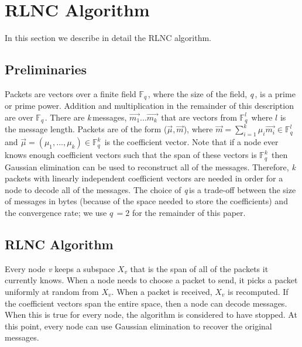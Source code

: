 \documentclass{article} %
\def\numMessages{\textit{k}\,}
\def\fieldSize{\textit{q}\,}
\begin{document}
\section{RLNC Algorithm}\label{subsec:RLNC}
In this section we describe in detail the RLNC algorithm.
\subsection{Preliminaries}
Packets are vectors over a finite field $\mathbb{F}_{\fieldSize}$, where the size of the field, \fieldSize, is a prime or prime power. Addition and multiplication in the remainder of this description are over $\mathbb{F}_{\fieldSize}$. There are \numMessages messages, $\vec{m_{1}}...\vec{m_{\numMessages}}$ that are vectors from $\mathbb{F}_{\fieldSize}^{l}$ where $l$ is the message length. Packets are of the form ($\vec{\mu}, \vec{m}$), where $\vec{m} = \sum_{i=1}^{\numMessages} \mu_i\vec{m_i} \in \mathbb{F}_{\fieldSize}^{l}$ and $\vec{\mu} = (\mu_1,...,\mu_k) \in \mathbb{F}_{\fieldSize}^{\numMessages}$ is the coefficient vector. Note that if a node ever knows enough coefficient vectors such that the span of these vectors is $\mathbb{F}_{\fieldSize}^{\numMessages}$ then Gaussian elimination can be used to reconstruct all of the messages. Therefore, \numMessages packets with linearly independent coefficient vectors are needed in order for a node to decode all of the messages. The choice of \fieldSize is a trade-off between the size of messages in bytes (because of the space needed to store the coefficients) and the convergence rate; we use $\fieldSize=2$ for the remainder of this paper. 
\subsection{RLNC Algorithm}
Every node \textit{v} keeps a subspace $X_v$ that is the span of all of the packets it currently knows. When a node needs to choose a packet to send, it picks a packet uniformly at random from $X_v$. When a packet is received, $X_v$ is recomputed. If the coefficient vectors span the entire space, then a node can decode messages. When this is true for every node, the algorithm is considered to have stopped. At this point, every node can use Gaussian elimination to recover the original messages.
\end{document}
